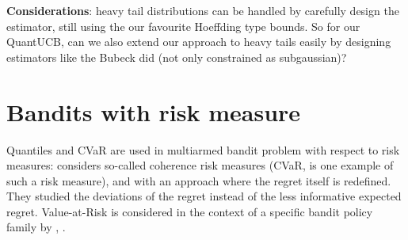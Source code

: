\documentclass{article}
\begin{document}
\textbf{Considerations}: heavy tail distributions can be handled by carefully design the estimator, still using the our favourite  Hoeffding type bounds. So for our QuantUCB, can we also extend our approach to heavy tails easily by designing estimators like the Bubeck did (not only constrained as subgaussian)? 

\section{Bandits with risk measure}
Quantiles and CVaR are used in multiarmed bandit problem with respect to risk measures:\cite{Maillard2013}  considers so-called coherence risk measures (CVaR, is one example of such a risk measure), and with an approach where the regret itself is redefined. They studied the deviations of the regret instead of the less informative expected regret.
Value-at-Risk is considered in the context of a specific bandit policy family by \cite{Audibert2007}, \cite{AUDIBERT20091876}.

\printbibliography
\end{document}
